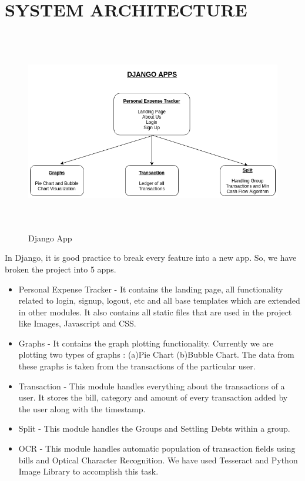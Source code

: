 \documentclass[12pt]{article}
\begin{document}
\pagebreak


\section{SYSTEM ARCHITECTURE}

\begin{figure}[!ht]
\centering
\includegraphics[height=3.5in]{Django_Apps.png} 
\caption{Django App}
\end{figure}
\newline
In Django, it is good practice to break every feature into a new app. So, we have broken the project into 5 apps.
\newline
\begin{itemize}
    \item Personal Expense Tracker - It contains the landing page, all functionality related to login, signup, logout, etc and all base templates which are extended in other modules. It also contains all static files that are used in the project like Images, Javascript and CSS.
    \item Graphs - It contains the graph plotting functionality. Currently we are plotting two types of graphs : (a)Pie Chart (b)Bubble Chart. The data from these graphs is taken from the transactions of the particular user.
    \item Transaction - This module handles everything about the transactions of a user. It stores the bill, category and amount of every transaction added by the user along with the timestamp. 
    \item Split - This module handles the Groups and Settling Debts within a group. 
    \item OCR - This module handles automatic population of transaction fields using bills and Optical Character Recognition. We have used Tesseract and Python Image Library to accomplish this task.
    
\end{itemize}
\end{document}
